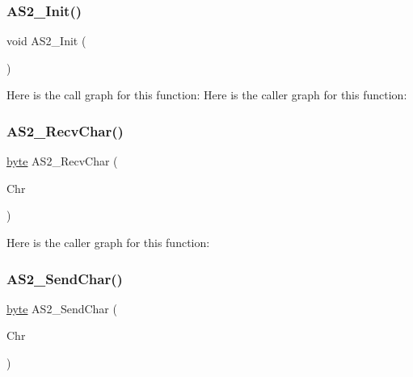 \subsubsection{\texorpdfstring{A\+S2\+\_\+\+Init()}{AS2\_Init()}}
{\footnotesize\ttfamily void A\+S2\+\_\+\+Init (\begin{DoxyParamCaption}\item[{void}]{ }\end{DoxyParamCaption})}

Here is the call graph for this function\+:
Here is the caller graph for this function\+:
\mbox{\label{group___a_s2__module_ga74c0ea40957a6853dd4b3c7228a4cc8b}} 
\subsubsection{\texorpdfstring{A\+S2\+\_\+\+Recv\+Char()}{AS2\_RecvChar()}}
{\footnotesize\ttfamily \hyperlink{group___p_e___types__module_ga0c8186d9b9b7880309c27230bbb5e69d}{byte} A\+S2\+\_\+\+Recv\+Char (\begin{DoxyParamCaption}\item[{\hyperlink{group___a_s2__module_ga170d994b72d9b50b90572e909959cbf1}{A\+S2\+\_\+\+T\+Com\+Data} $\ast$}]{Chr }\end{DoxyParamCaption})}

Here is the caller graph for this function\+:
\mbox{\label{group___a_s2__module_ga8db8321e87885719d7537d4c2216133d}} 
\subsubsection{\texorpdfstring{A\+S2\+\_\+\+Send\+Char()}{AS2\_SendChar()}}
{\footnotesize\ttfamily \hyperlink{group___p_e___types__module_ga0c8186d9b9b7880309c27230bbb5e69d}{byte} A\+S2\+\_\+\+Send\+Char (\begin{DoxyParamCaption}\item[{\hyperlink{group___a_s2__module_ga170d994b72d9b50b90572e909959cbf1}{A\+S2\+\_\+\+T\+Com\+Data}}]{Chr }\end{DoxyParamCaption})}

